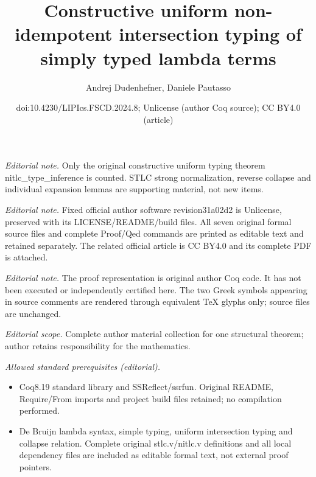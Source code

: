 \documentclass[10pt,a4paper]{article}
\title{Constructive uniform non-idempotent intersection typing of simply typed lambda terms}
\author{Andrej Dudenhefner, Daniele Pautasso}
\date{doi:10.4230/LIPIcs.FSCD.2024.8; Unlicense (author Coq source); CC BY4.0 (article)}
\begin{document}
\maketitle
\noindent\textit{Editorial note.} Only the original constructive uniform typing theorem nitlc\_type\_inference is counted. STLC strong normalization, reverse collapse and individual expansion lemmas are supporting material, not new items.\par\medskip
\noindent\textit{Editorial note.} Fixed official author software revision31a02d2 is Unlicense, preserved with its LICENSE/README/build files. All seven original formal source files and complete Proof/Qed commands are printed as editable text and retained separately. The related official article is CC BY4.0 and its complete PDF is attached.\par\medskip
\noindent\textit{Editorial note.} The proof representation is original author Coq code. It has not been executed or independently certified here. The two Greek symbols appearing in source comments are rendered through equivalent TeX glyphs only; source files are unchanged.\par\medskip
\noindent\textit{Editorial scope.} Complete author material collection for one structural theorem; author retains responsibility for the mathematics.\par\medskip
\noindent\textit{Allowed standard prerequisites (editorial).}\begin{itemize}
\item Coq8.19 standard library and SSReflect/ssrfun. Original README, Require/From imports and project build files retained; no compilation performed.
\item De Bruijn lambda syntax, simple typing, uniform intersection typing and collapse relation. Complete original stlc.v/nitlc.v definitions and all local dependency files are included as editable formal text, not external proof pointers.
\end{itemize}\medskip
\clearpage
\end{document}
